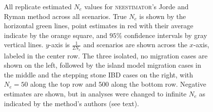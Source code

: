 \begin{landscape}
\begin{figure}[ht]
\centering
{}
\caption[All replicate estimated $N_e$ values for \textsc{neestimator}'s Jorde and Ryman method across all scenarios.]{All replicate estimated $N_e$ values for \textsc{neestimator}'s Jorde and Ryman method across all scenarios. True $N_e$ is shown by the horizontal green lines, point estimates in red with their average indicate by the orange square, and $95\%$ confidence intervals by gray vertical lines. $y$-axis is $\frac{1}{2 N_e}$ and scenarios are shown across the $x$-axis, labeled in the center row. The three isolated, no migration cases are shown on the left, followed by the island model migration cases in the middle and the stepping stone IBD cases on the right, with $N_e = 50$ along the top row and 500 along the bottom row. Negative estimates are shown, but in analyses were changed to infinite $N_e$ as indicated by the method's authors (see text).}
\label{fig:supp_jorde}
\end{figure}



\end{landscape}
